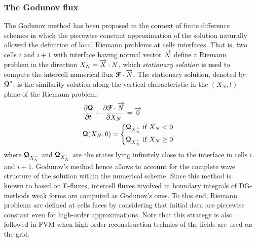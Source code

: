 \subsubsection*{The Godunov flux}
The Godunov method \cite{Godunov_method} has been proposed in the context of finite difference schemes in which the piecewise constant approximation of the solution naturally allowed the definition of local Riemann problems at cells interfaces. That is, two cells $i$ and $i+1$ with interface having normal vector ${\overrightarrow{N}}$ define a Riemann problem in the direction $X_N={\overrightarrow{X}}\cdot{N}$, which \textit{stationary solution} is used to compute the intercell numerical flux ${\boldsymbol{\mathcal{F}}} \cdot {\overrightarrow{N}}$. The stationary solution, denoted by ${\boldsymbol{\mathcal{Q}}}^*$, is the similarity solution along the vertical characteristic in the $(X_N,t)$ plane of the Riemann problem:
\begin{equation}
  \label{eq:RP_mesh}
  \begin{aligned}
    &\frac{\partial {\boldsymbol{\mathcal{Q}}}}{\partial t} + \frac{\partial {\boldsymbol{\mathcal{F}}} \cdot {\overrightarrow{N}}}{\partial X_N} = {\overrightarrow{0}}  \\
    & {\boldsymbol{\mathcal{Q}}}(X_N,0)= \left\lbrace 
      \begin{aligned}
        & {\boldsymbol{\mathcal{Q}}}_{X_N^-} \text{ if } X_N <0 \\
        & {\boldsymbol{\mathcal{Q}}}_{X_N^{+}} \text{ if } X_N \geq 0
      \end{aligned}
        \right.
  \end{aligned}
\end{equation}
where ${\boldsymbol{\mathcal{Q}}}_{X_N^-}$ and ${\boldsymbol{\mathcal{Q}}}_{X_N^{+}}$ are the states lying infinitely close to the interface in cells $i$ and $i+1$. 
Godunov's method hence allows to account for the complete wave structure of the solution within the numerical scheme. Since this method is known to based on E-fluxes, intercell fluxes involved in boundary integrals of DG-methods weak forms are computed as Godunov's ones. To this end, Riemann problems are defined at cells faces by considering that initial data are piecewise constant even for high-order approximations. Note that this strategy is also followed in FVM when high-order reconstruction technics of the fields are used on the grid.

